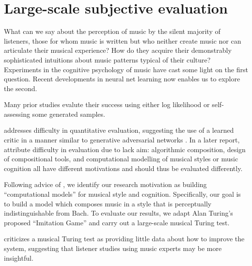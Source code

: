 \chapter{Large-scale subjective evaluation}
\begin{savequote}[75mm]
  What can we say about the perception of music by the silent majority of
  listeners, those for whom music is written but who neither create music nor
  can articulate their musical experience? How do they acquire their
  demonstrably sophisticated intuitions about music patterns
  typical of their culture? Experiments in the cognitive psychology of music
  have cast some light on the first question. Recent developments in neural net learning
  now enables us to explore the second.
\end{savequote}


\ifpdf
    \graphicspath{{Chapter7/Figs/Raster/}{Chapter7/Figs/PDF/}{Chapter7/Figs/}}
\else
    \graphicspath{{Chapter7/Figs/Vector/}{Chapter7/Figs/}}
\fi

Many prior studies \citep{Eck2002-blues,Allan2005,Boulanger-Lewandowski2012,Lyu2015}
evalute their success using either log likelihood or self-assessing
some generated samples.

\citep{pearce2001towards} addresses difficulty in quantitative evaluation,
suggesting the use of a learned critic in a manner similar to generative
adversarial networks \citep{goodfellow2014generative}. In a later report,
\citep{pearce2002motivations} attribute difficulty in evaluation due to lack
aim: algorithmic composition, design of compositional tools, and computational
modelling of musical styles or music cognition all have different motivations
and should thus be evaluated differently.

Following advice of \citep{pearce2002motivations}, we identify our research
motivation as building ``computational models'' for musical style and cognition.
Specifically, our goal is to build a model which composes music in a style
that is perceptually indistinguishable from Bach.
To evaluate our results, we adapt Alan Turing's proposed ``Imitation Game''
\citep{turing1950computing} and carry out a large-scale musical Turing test.

\citep{ariza2009interrogator} criticizes a musical Turing test as providing little data about
how to improve the system, suggesting that listener studies using music experts
may be more insightful.

